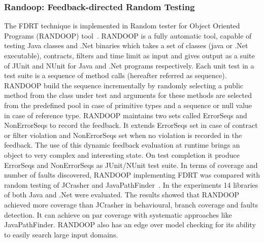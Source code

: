 \subsubsection{Randoop: Feedback-directed Random Testing}
The FDRT technique is implemented in Random tester for Object Oriented Programs (RANDOOP) tool~\cite{Pacheco2007b}. RANDOOP is a fully automatic tool, capable of testing Java classes and .Net binaries which takes a set of classes (java or .Net executable), contracts, filters and time limit as input and gives output as a suite of JUnit and NUnit for Java and .Net programs respectively. Each unit test in a test suite is a sequence of method calls (hereafter referred as sequence). RANDOOP build the sequence incrementally by randomly selecting a public method from the class under test and arguments for these methods are selected from the predefined pool in case of primitive types and a sequence or null value in case of reference type. RANDOOP maintains two sets called ErrorSeqs and NonErrorSeqs to record the feedback. It extends ErrorSeqs set in case of contract or filter violation and NonErrorSeqs set when no violation is recorded in the feedback. The use of this dynamic feedback evaluation at runtime brings an object to very complex and interesting state. On test completion it produce ErrorSeqs and NonErrorSeqs as JUnit/NUnit test suite. In terms of coverage and number of faults discovered, RANDOOP implementing FDRT was compared with random testing of JCrasher and JavaPathFinder~\cite{visser2004test}. In the experiments 14 libraries of both Java and .Net were evaluated. The results showed that RANDOOP achieved more coverage than JCrasher in behavioural, branch coverage and faults detection. It can achieve on par coverage with systematic approaches like JavaPathFinder. RANDOOP also has an edge over model checking for its ability to easily search large input domains.



